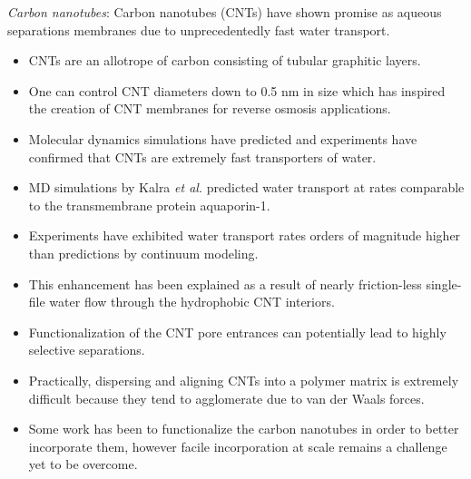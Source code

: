   \textit{Carbon nanotubes}: Carbon nanotubes (CNTs) have shown promise as aqueous separations membranes
  due to unprecedentedly fast water transport.\cite{humplik_nanostructured_2011}
  \begin{itemize}
    \item CNTs are an allotrope of carbon consisting of tubular graphitic layers.~\cite{iijima_helical_1991}
    \item One can control CNT diameters down to 0.5 nm in size which has inspired the
    creation of CNT membranes for reverse osmosis applications.~\cite{sun_creating_2000}
    \item Molecular dynamics simulations have predicted and experiments have confirmed that
    CNTs are extremely fast transporters of water.~\cite{hummer_water_2001,joseph_why_2008}
    \item MD simulations by Kalra \textit{et al.} predicted water transport at rates comparable
    to the transmembrane protein aquaporin-1.~\cite{kalra_osmotic_2003}
    \item Experiments have exhibited water transport rates orders of magnitude higher than 
    predictions by continuum modeling.~\cite{holt_fast_2006}
    \item This enhancement has been explained as a result of nearly friction-less single-file water
    flow through the hydrophobic CNT interiors.~\cite{kalra_osmotic_2003}
    \item Functionalization of the CNT pore entrances can potentially lead to highly selective separations.~\cite{fornasiero_ion_2008}
	\item Practically, dispersing and aligning CNTs into a polymer matrix is extremely
    difficult because they tend to agglomerate due to van der Waals forces.~\cite{sahoo_polymer_2010}
    \item Some work has been to functionalize the carbon nanotubes in order to better incorporate them,
    however facile incorporation at scale remains a challenge yet to be overcome.~\cite{kim_polysulfone_2007}
  \end{itemize}
  
